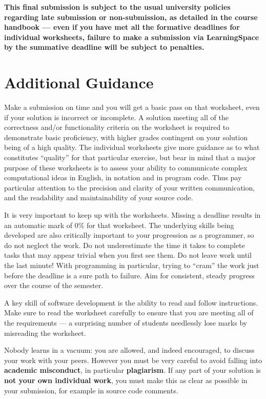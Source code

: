 \documentclass{../../fal_assignment}
\begin{document}
\textbf{This final submission is subject to the usual university policies regarding late submission or non-submission,
as detailed in the course handbook ---
even if you have met all the formative deadlines for individual worksheets,
failure to make a submission via LearningSpace by the summative deadline will be subject to penalties.}

\section*{Additional Guidance}

Make a submission on time and you will get a basic pass on that worksheet,
even if your solution is incorrect or incomplete.
A solution meeting all of the correctness and/or functionality criteria on the worksheet is required to demonstrate basic proficiency,
with higher grades contingent on your solution being of a high quality.
The individual worksheets give more guidance as to what constitutes ``quality'' for that particular exercise,
but bear in mind that a major purpose of these worksheets is to assess your ability to communicate
complex computational ideas in English, in notation and in program code.
Thus pay particular attention to the precision and clarity of your written communication,
and the readability and maintainability of your source code.

It is very important to keep up with the worksheets. Missing a deadline results in an automatic mark of 0\% for that worksheet.
The underlying skills being developed are also critically important to your progression as a programmer, so do not neglect the work.
Do not underestimate the time it takes to complete tasks that may appear trivial when you first see them.
Do not leave work until the last minute! With programming in particular, trying to ``cram'' the work just before the deadline is a sure path to failure. Aim for consistent, steady progress over the course of the semester.

A key skill of software development is the ability to read and follow instructions.
Make sure to read the worksheet carefully to ensure that you are meeting all of the requirements ---
a surprising number of students needlessly lose marks by misreading the worksheet.

Nobody learns in a vacuum: you are allowed, and indeed encouraged, to discuss your work with your peers. However you must be very careful to avoid falling into \textbf{academic misconduct}, in particular \textbf{plagiarism}. If any part of your solution is \textbf{not your own individual work}, you must make this as clear as possible in your submission, for example in source code comments.
\end{document}

